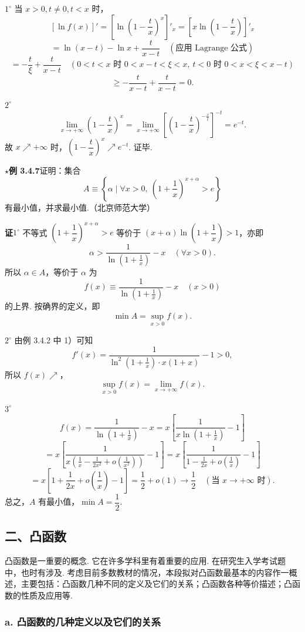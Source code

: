 \documentclass[UTF8, 12pt, fontset=fandol, oneside]{ctexart}
\begin{document}
$1^\circ$ 当 $x>0,t\ne0,t<x$ 时，
\[
  [\ln f(x)]'=\left[\ln\left(1-\frac tx\right)^x\right]'_x
  =\left[x\ln\left(1-\frac tx\right)\right]'_x
\]
\[
  =\ln(x-t)-\ln x+\frac{t}{x-t}\quad(\text{应用 Lagrange 公式})
\]
\[
  =-\frac{t}{\xi}+\frac{t}{x-t}
  \quad(0<t<x\text{ 时 }0<x-t<\xi<x,\ t<0\text{ 时 }0<x<\xi<x-t)
\]
\[
  \ge -\frac{t}{x-t}+\frac{t}{x-t}=0.
\]

$2^\circ$
\[
  \lim_{x\to+\infty}\left(1-\frac tx\right)^x
  =\lim_{x\to+\infty}\left[\left(1-\frac tx\right)^{-\frac xt}\right]^{-t}
  =e^{-t}.
\]
故 $x\nearrow+\infty$ 时，$\left(1-\dfrac tx\right)^x\nearrow e^{-t}$. 证毕.

\noindent\textbf{$\star$例 3.4.7}\quad 证明：集合
\[
  A\equiv\left\{\alpha\mid \forall x>0,\ \left(1+\frac1x\right)^{x+\alpha}>e\right\}
\]
有最小值，并求最小值.（北京师范大学）

\noindent\textbf{证}\quad $1^\circ$ 不等式 $\left(1+\dfrac1x\right)^{x+\alpha}>e$ 等价于 $(x+\alpha)\ln\left(1+\dfrac1x\right)>1$，亦即
\[
  \alpha>\frac1{\ln\left(1+\frac1x\right)}-x\quad(\forall x>0).
\]
所以 $\alpha\in A$，等价于 $\alpha$ 为
\[
  f(x)\equiv\frac1{\ln\left(1+\frac1x\right)}-x\quad(x>0)
\]
的上界. 按确界的定义，即
\[
  \min A=\sup_{x>0}f(x).
\]

$2^\circ$ 由例 3.4.2 中 1）可知
\[
  f'(x)=\frac1{\ln^2\left(1+\frac1x\right)\cdot x(1+x)}-1>0,
\]
所以 $f(x)\nearrow$，
\[
  \sup_{x>0}f(x)=\lim_{x\to+\infty}f(x).
\]

$3^\circ$
\[
  f(x)=\frac1{\ln\left(1+\frac1x\right)}-x
  =x\left[\frac1{x\ln\left(1+\frac1x\right)}-1\right]
\]
\[
  =x\left[\frac1{x\left(\frac1x-\frac1{2x^2}+o\left(\frac1{x^2}\right)\right)}-1\right]
  =x\left[\frac1{1-\frac1{2x}+o\left(\frac1x\right)}-1\right]
\]
\[
  =x\left[1+\frac1{2x}+o\left(\frac1x\right)-1\right]
  =\frac12+o(1)\to\frac12\quad(\text{当 }x\to+\infty\text{ 时}).
\]
总之，$A$ 有最小值，$\min A=\dfrac12$.

\subsection*{二、凸函数}

凸函数是一重要的概念. 它在许多学科里有着重要的应用. 在研究生入学考试题中，也时有涉及. 考虑目前多数教材的情况，本段拟对凸函数最基本的内容作一概述，主要包括：凸函数几种不同的定义及它们的关系；凸函数各种等价描述；凸函数的性质及应用等.

\subsubsection*{a. 凸函数的几种定义以及它们的关系}
\end{document}
